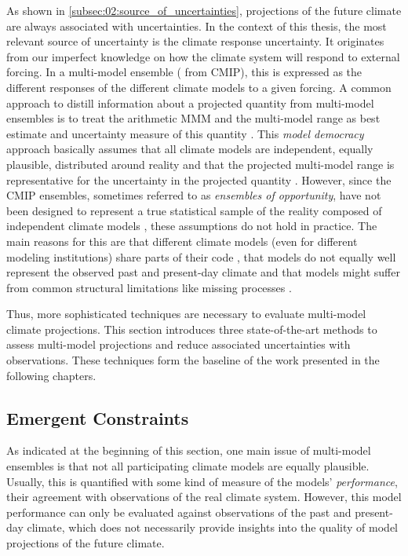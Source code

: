 As shown in \cref{subsec:02:source_of_uncertainties}, projections of the future
climate are always associated with uncertainties. In the context of this
thesis, the most relevant source of uncertainty is the climate response
uncertainty. It originates from our imperfect knowledge on how the climate
system will respond to external forcing. In a multi-model ensemble (\eg{} from
\ac{CMIP}), this is expressed as the different responses of the different
climate models to a given forcing. A common approach to distill information
about a projected quantity from multi-model ensembles is to treat the
arithmetic \ac{MMM} and the multi-model range as best estimate and uncertainty
measure of this quantity \autocite{Collins2013}. This \emph{model democracy}
approach basically assumes that all climate models are independent, equally
plausible, distributed around reality and that the projected multi-model range
is representative for the uncertainty in the projected quantity
\autocite{Knutti2017a}. However, since the \ac{CMIP} ensembles, sometimes
referred to as \emph{ensembles of opportunity}, have not been designed to
represent a true statistical sample of the reality composed of independent
climate models \autocite{Tebaldi2007}, these assumptions do not hold in
practice. The main reasons for this are that different climate models (even for
different modeling institutions) share parts of their code
\autocite{Abramowitz2019, Knutti2013}, that models do not equally well
represent the observed past and present-day climate \autocite{Gleckler2008,
  Knutti2013} and that models might suffer from common structural limitations
like missing processes \autocite{Knutti2017a}.

Thus, more sophisticated techniques are necessary to evaluate multi-model
climate projections. This section introduces three state-of-the-art methods to
assess multi-model projections and reduce associated uncertainties with
observations. These techniques form the baseline of the work presented in the
following chapters.


\subsection{Emergent Constraints}
\label{subsec:02:emergent_constraints}

As indicated at the beginning of this section, one main issue of multi-model
ensembles is that not all participating climate models are equally plausible.
Usually, this is quantified with some kind of measure of the models'
\emph{performance}, \ie{} their agreement with observations of the real climate
system. However, this model performance can only be evaluated against
observations of the past and present-day climate, which does not necessarily
provide insights into the quality of model projections of the future climate.

